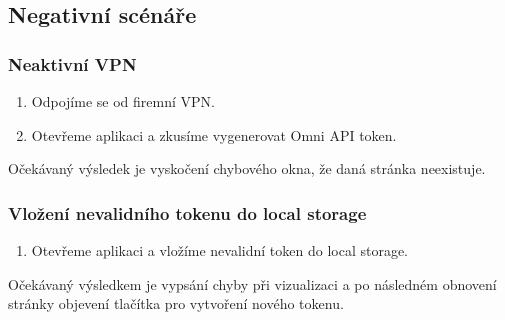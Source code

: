 \documentclass[czech, bc, kiv, he, iso690numb]{fasthesis}
\begin{document}
\subsection{Negativní scénáře}

\subsubsection{Neaktivní VPN}
\begin{enumerate}
	\item Odpojíme se od firemní VPN.
	\item Otevřeme aplikaci a zkusíme vygenerovat Omni API token.
\end{enumerate}
Očekávaný výsledek je vyskočení chybového okna, že daná stránka neexistuje.

\subsubsection{Vložení nevalidního tokenu do local storage}
\begin{enumerate}
	\item Otevřeme aplikaci a vložíme nevalidní token do local storage.
\end{enumerate}
Očekávaný výsledkem je vypsání chyby při vizualizaci a po následném obnovení stránky objevení tlačítka pro vytvoření nového tokenu.



\backmatter
\printbibliography
\listoffigures
\listoftables
\listoflistings

%
%
\setbackpageqrcode
\backpage
\end{document}
